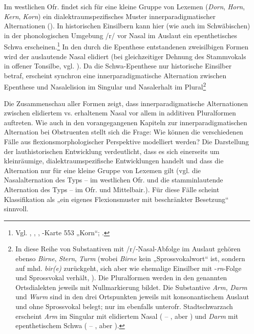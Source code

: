 Im westlichen Ofr. findet sich für eine kleine Gruppe von Lexemen (\textit{Dorn}, \textit{Horn}, \textit{Kern}, \textit{Korn}) ein dialektraumspezifisches Muster innerparadigmatischer Alternationen (). In historischen Einsilbern kann hier (wie auch im Schwäbischen) in der phonologischen Umgebung /r/ vor Nasal im Auslaut ein epenthetisches Schwa erscheinen.\footnote{Vgl. \citealt[120 und Karten 60--61]{SBS3}, \citet[389]{Schirmunski1962}, \citealt[Karte 7]{SMF7}, \citealt{WA}-Karte 553 „Korn“; \citet[Karte 18]{Fischer1895}.} In den durch die Epenthese entstandenen zweisilbigen Formen wird der auslautende Nasal elidiert (bei gleichzeitiger Dehnung des Stammvokals in offener Tonsilbe, vgl. \citealt[120]{SBS3}). Da die Schwa-Epenthese nur historische Einsilber betraf, erscheint synchron eine innerparadigmatische Alternation zwischen Epenthese und Nasalelision im Singular und Nasalerhalt im Plural\footnote{In diese Reihe von Substantiven mit /r/-Nasal-Abfolge im Auslaut gehören ebenso \textit{Birne}, \textit{Stern}, \textit{Turm} (wobei \textit{Birne} kein „Sprossvokalwort“ ist, sondern auf mhd. \textit{bir(e)} zurückgeht, sich aber wie ehemalige Einsilber mit -\textit{rn}{}-Folge und Sprossvokal verhält, \citealt[120 und 154]{SBS3}). Die Pluralformen werden in den genannten Ortsdialekten jeweils mit Nullmarkierung bildet. Die Substantive \textit{Arm,} \textit{Darm} und \textit{Wurm} sind in den drei Ortspunkten jeweils mit konsonantischem Auslaut und ohne Sprossvokal belegt; nur im ebenfalls unterofr. Stadtschwarzach erscheint \textit{Arm} im Singular mit elidiertem Nasal ( -- , aber      ) und \textit{Darm} mit epenthetischem Schwa ( -- , aber     ).}

Die Zusammenschau aller Formen zeigt, dass innerparadigmatische Alternationen zwischen elidiertem vs. erhaltenem Nasal vor allem in additiven Pluralformen auftreten. Wie auch in den vorangegangenen Kapiteln zur innerparadigmatischen Alternation bei Obstruenten stellt sich die Frage: Wie können die verschiedenen Fälle aus flexionsmorphologischer Perspektive modelliert werden? Die Darstellung der lauthistorischen Entwicklung verdeutlicht, dass es sich einerseits um kleinräumige, dialektraumspezifische Entwicklungen handelt und dass die Alternation nur für eine kleine Gruppe von Lexemen gilt (vgl. die Nasalalternation des Typs  --  im westlichen Ofr. und die stamminlautende Alternation des Typs  --  im Ofr. und Mittelbair.). Für diese Fälle scheint  Klassifikation als „ein eigenes Flexionsmuster mit beschränkter Besetzung“ sinnvoll.


